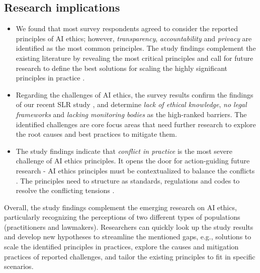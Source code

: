 \subsection{Research implications}
\begin{itemize}
    \item We found that most survey respondents agreed to consider the reported principles of AI ethics; however, \textit{transparency}, \textit{accountability} and \textit{privacy} are identified as the most common principles. The study findings complement the existing literature by revealing the most critical principles and call for future research to define the best solutions for scaling the highly significant principles in practice \cite{morley2020initial}.
    \item Regarding the challenges of AI ethics, the survey results confirm the findings of our recent SLR study \cite{AR13}, and determine \textit{lack of ethical knowledge}, \textit{no legal frameworks} and \textit{lacking monitoring bodies} as the high-ranked barriers. The identified challenges are core focus areas that need further research to explore the root causes and best practices to mitigate them.
    \item The study findings indicate that \textit{conflict in practice} is the most severe challenge of AI ethics principles. It opens the door for action-guiding future research - AI ethics principles must be contextualized to balance the conflicts \cite{whittlestone2019role}. The principles need to structure as standards, regulations and codes to resolve the conflicting tensions \cite{whittlestone2019role}.
\end{itemize}

Overall, the study findings complement the emerging research on AI ethics, particularly recognizing the perceptions of two different types of populations (practitioners and lawmakers). Researchers can quickly look up the study results and develop new hypotheses to streamline the mentioned gaps, e.g., solutions to scale the identified principles in practices, explore the causes and mitigation practices of reported challenges, and tailor the existing principles to fit in specific scenarios.

